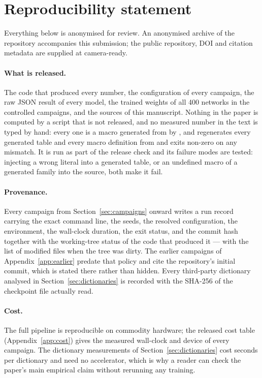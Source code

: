 \section{Reproducibility statement}
\label{app:reproducibility}

Everything below is anonymised for review. An anonymised archive of the repository accompanies this
submission; the public repository, DOI and citation metadata are supplied at camera-ready.

\paragraph{What is released.} The code that produced every number, the configuration of every
campaign, the raw JSON result of every model, the trained weights of all 400 networks in the
controlled campaigns, and the sources of this manuscript. Nothing in the paper is computed by a
script that is not released, and no measured number in the text is typed by hand: every one is a
macro generated from  by , and
 regenerates every generated table and every macro
definition from  and exits non-zero on any mismatch. It is run as part of the
release check and its failure modes are tested: injecting a wrong literal into a generated table, or
an undefined macro of a generated family into the source, both make it fail.

\paragraph{Provenance.} Every campaign from Section~\ref{sec:campaigns} onward writes a run record
carrying the exact command line, the seeds, the resolved configuration, the environment, the
wall-clock duration, the exit status, and the commit hash together with the working-tree status of the
code that produced it --- with the list of modified files when the tree was dirty. The earlier
campaigns of Appendix~\ref{app:earlier} predate that policy and cite the repository's initial commit,
which is stated there rather than hidden. Every third-party dictionary analysed in
Section~\ref{sec:dictionaries} is recorded with the SHA-256 of the checkpoint file actually read.

\paragraph{Cost.} The full pipeline is reproducible on commodity hardware; the released cost table
(Appendix~\ref{app:cost}) gives the measured wall-clock and device of every campaign. The dictionary
measurements of Section~\ref{sec:dictionaries} cost seconds per dictionary and need no accelerator,
which is why a reader can check the paper's main empirical claim without rerunning any training.


